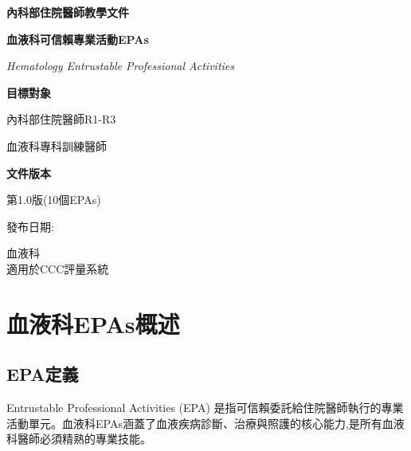 \documentclass[12pt,a4paper]{article}
\newcommand{\mydate}{\DTMtoday}
\begin{document}
\begin{titlepage}
    \centering
    {\LARGE\textcolor{heme_red}{\textbf{內科部住院醫師教學文件}}\par}
    \vspace{1cm}
    {\huge\bfseries 血液科可信賴專業活動EPAs\par}
    \vspace{0.5cm}
    {\Large\textcolor{heme_crimson}{\textit{Hematology Entrustable Professional Activities}}\par}
    \vspace{1cm}
    
    \begin{tcolorbox}[
        colback=heme_crimson!5!white,
        colframe=heme_crimson,
        width=0.8\textwidth,
        arc=10pt,
        boxrule=1pt
    ]
    \centering
    {\large\textbf{目標對象}\par}
    \vspace{0.3cm}
    內科部住院醫師R1-R3\par
    血液科專科訓練醫師\par
    \vspace{0.5cm}
    {\large\textbf{文件版本}\par}
    \vspace{0.3cm}
    第1.0版(10個EPAs)\par
    發布日期:\mydate\par
    \end{tcolorbox}

    \vfill
    
    {\large 血液科 \\
    適用於CCC評量系統\par}
    
    \vspace{0.5cm}
\end{titlepage}

\newpage
\tableofcontents
\newpage

\section{血液科EPAs概述}

\subsection{EPA定義}
Entrustable Professional Activities (EPA) 是指可信賴委託給住院醫師執行的專業活動單元。血液科EPAs涵蓋了血液疾病診斷、治療與照護的核心能力,是所有血液科醫師必須精熟的專業技能。
\end{document}
